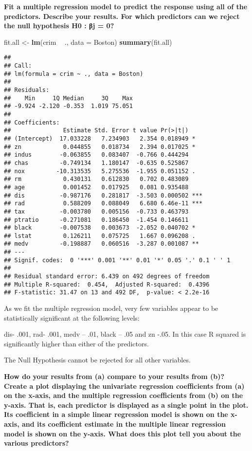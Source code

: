\documentclass[]{article}
\newenvironment{Shaded}{\begin{snugshade}}{\end{snugshade}}
\newcommand{\KeywordTok}[1]{\textcolor[rgb]{0.13,0.29,0.53}{\textbf{#1}}}
\newcommand{\DataTypeTok}[1]{\textcolor[rgb]{0.13,0.29,0.53}{#1}}
\newcommand{\StringTok}[1]{\textcolor[rgb]{0.31,0.60,0.02}{#1}}
\newcommand{\OperatorTok}[1]{\textcolor[rgb]{0.81,0.36,0.00}{\textbf{#1}}}
\newcommand{\NormalTok}[1]{#1}
\begin{document}
\textbf{Fit a multiple regression model to predict the response using
all of the predictors. Describe your results. For which predictors can
we reject the null hypothesis H0 : βj = 0?}

\begin{Shaded}
\begin{Highlighting}[]
\NormalTok{fit.all <-}\StringTok{ }\KeywordTok{lm}\NormalTok{(crim }\OperatorTok{~}\StringTok{ }\NormalTok{., }\DataTypeTok{data =}\NormalTok{ Boston)}
\KeywordTok{summary}\NormalTok{(fit.all)}
\end{Highlighting}
\end{Shaded}

\begin{verbatim}
## 
## Call:
## lm(formula = crim ~ ., data = Boston)
## 
## Residuals:
##    Min     1Q Median     3Q    Max 
## -9.924 -2.120 -0.353  1.019 75.051 
## 
## Coefficients:
##               Estimate Std. Error t value Pr(>|t|)    
## (Intercept)  17.033228   7.234903   2.354 0.018949 *  
## zn            0.044855   0.018734   2.394 0.017025 *  
## indus        -0.063855   0.083407  -0.766 0.444294    
## chas         -0.749134   1.180147  -0.635 0.525867    
## nox         -10.313535   5.275536  -1.955 0.051152 .  
## rm            0.430131   0.612830   0.702 0.483089    
## age           0.001452   0.017925   0.081 0.935488    
## dis          -0.987176   0.281817  -3.503 0.000502 ***
## rad           0.588209   0.088049   6.680 6.46e-11 ***
## tax          -0.003780   0.005156  -0.733 0.463793    
## ptratio      -0.271081   0.186450  -1.454 0.146611    
## black        -0.007538   0.003673  -2.052 0.040702 *  
## lstat         0.126211   0.075725   1.667 0.096208 .  
## medv         -0.198887   0.060516  -3.287 0.001087 ** 
## ---
## Signif. codes:  0 '***' 0.001 '**' 0.01 '*' 0.05 '.' 0.1 ' ' 1
## 
## Residual standard error: 6.439 on 492 degrees of freedom
## Multiple R-squared:  0.454,  Adjusted R-squared:  0.4396 
## F-statistic: 31.47 on 13 and 492 DF,  p-value: < 2.2e-16
\end{verbatim}

As we fit the multiple regression model, very few variables appear to be
statistically significant at the following levels:

dis- .001, rad- .001, medv -- .01, black -- .05 and zn -.05. In this
case R squared is significantly higher than either of the predictors.

The Null Hypothesis cannot be rejected for all other variables.

\textbf{How do your results from (a) compare to your results from (b)?
Create a plot displaying the univariate regression coefficients from (a)
on the x-axis, and the multiple regression coefficients from (b) on the
y-axis. That is, each predictor is displayed as a single point in the
plot. Its coefficient in a simple linear regression model is shown on
the x-axis, and its coefficient estimate in the multiple linear
regression model is shown on the y-axis. What does this plot tell you
about the various predictors?}
\end{document}

